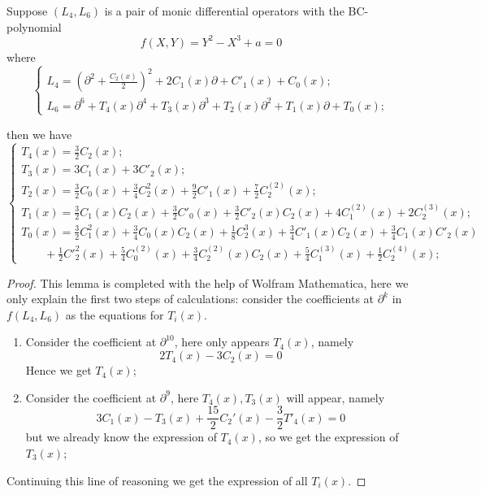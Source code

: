 \documentclass[10pt,a4paper]{amsart}
\begin{document}
\begin{lemma}
	\label{L:L6}
Suppose $(L_4,L_6)$ is a pair of monic differential operators with the BC-polynomial  $$f(X,Y)=Y^2-X^3+a=0$$
where
\begin{equation}\label{L46}
\begin{cases}
L_4=(\partial^2+\frac{C_2(x)}{2})^2+2C_1(x)\partial +C'_1(x)+C_0(x);
\\L_6=\partial^6+T_4(x)\partial^4+T_3(x)\partial^3+T_2(x)\partial^2+
T_1(x)\partial+T_0(x);
\end{cases}
\end{equation}


then we have
\begin{equation}\label{Tix}
\begin{cases}
T_4(x) = \frac{3}{2} C_2(x);
\\T_3(x) = 3 C_1(x) + 3 C'_2(x);
\\T_2(x)=\frac{3}{2}C_{0}(x)+\frac{3}{4}C^{2}_2(x)+\frac{9}{2}C'_{1}(x)+\frac{7}{2}C^{(2)}_{2}(x);
\\T_1(x)=\frac{3}{2}C_1(x)C_2(x)+\frac{3}{2}C'_{0}(x)+\frac{3}{2}C'_2(x)C_2(x)+4C^{(2)}_1(x)+2C^{(3)}_2(x);
\\T_0(x)=\frac{3}{2}C^2_1(x)+\frac{3}{4}C_0(x)C_2(x)+\frac{1}{8}C^3_2(x)+\frac{3}{4}C'_1(x)C_2(x)+\frac{3}{4}C_1(x)C'_2(x)
\\\qquad+\frac{1}{2}C'^2_2(x)+\frac{5}{4}C^{(2)}_0(x)+\frac{3}{4}C^{(2)}_2(x)C_2(x)+\frac{5}{4}C^{(3)}_1(x)
+\frac{1}{2}C^{(4)}_2(x);
\end{cases}
\end{equation}
\end{lemma}

\begin{proof}
	This lemma is completed with the help of Wolfram Mathematica, here we only explain the first two steps of calculations: consider the coefficients at $\partial^{k}$ in $f(L_4,L_6)$ as the equations for $T_i(x)$.
	\begin{enumerate}
		\item Consider the coefficient at $\partial^{10}$, here only appears $T_{4}(x)$, namely
		$$2T_4(x)-3C_{2}(x)=0 $$ 
		Hence we get $T_4(x)$;
		\item Consider the coefficient at $\partial^{9}$, here $T_{4}(x),T_3(x)$ will appear, namely
		$$
		3 C_1(x) - T_3(x) + \frac{15}{2} C_2'(x) - 
		\frac{3}{2} T'_{4}(x)=0
		$$
		but we already know the expression of $T_4(x)$, so we get the expression of $T_{3}(x)$;
		\end{enumerate} 
Continuing this line of reasoning  we  get the expression of all $T_i(x)$.
\end{proof}
\end{document}

